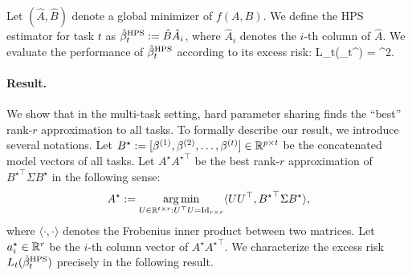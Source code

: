 Let $(\hat A, \hat B)$ denote a global minimizer of $f(A, B)$.
We define the HPS estimator for task $t$ as $\hat \beta_t^{\textup{HPS}} := \hat B \hat A_i$, where $\hat A_i$ denotes the $i$-th column of $\hat A$.
We evaluate the performance of $\hat{\beta}_t^{\textup{HPS}}$ according to its excess risk:
\be\label{ith_loss}
    L_t(\hat{\beta}_t^{\MTL}) = ^2.
\ee

\paragraph{Result.} We show that in the multi-task setting, hard parameter sharing finds the ``best'' rank-$r$ approximation to all tasks.
To formally describe our result, we introduce several notations.
Let $B^\star := [{\beta}^{(1)},{\beta}^{(2)},\dots,{\beta}^{(t)}] \in \mathbb{R}^{p\times t}$ be the concatenated model vectors of all tasks.
Let $A^{\star} {A^{\star}}^{\top}$ be the best rank-$r$ approximation of ${B^{\star}}^\top\Sigma B^{\star}$ in the following sense:
\begin{align}\label{eq_A_star}
	A^{\star} \define \argmin_{U\in\real^{t\times r} : U^{\top} U = \id_{r\times r}} \inner{U U^{\top}} {{B^{\star}}^{\top} \Sigma B^{\star}},
\end{align}
where $\langle \cdot ,\cdot \rangle $ denotes the Frobenius inner product between two matrices.
Let $a_i^{\star}\in\mathbb{R}^r$ be the $i$-th column vector of $A^{\star}{A^{\star}}^{\top}$.
We characterize the excess risk $L_t(\hat{\beta}_t^{\textup{HPS}})$ precisely in the following result.

